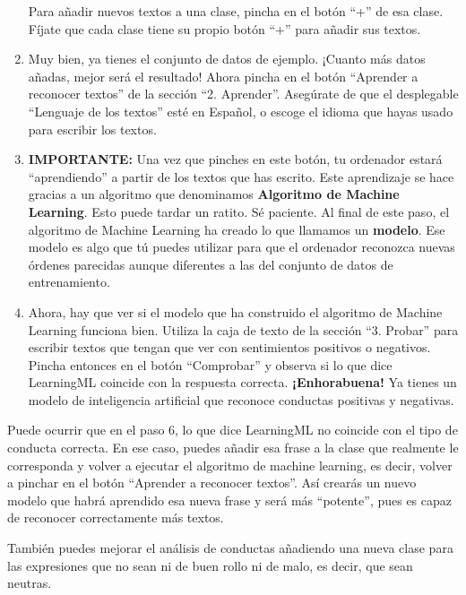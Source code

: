 \begin{enumerate}
    Para añadir nuevos textos a una clase, pincha en el botón ``+'' de esa clase. Fíjate que cada clase tiene su propio botón ``+'' para añadir sus textos.
    \item Muy bien, ya tienes el conjunto de datos de ejemplo. ¡Cuanto más datos añadas, mejor será el resultado! Ahora pincha en el botón ``Aprender a reconocer textos'' de la sección ``2. Aprender''. Asegúrate de que el desplegable ``Lenguaje de los textos'' esté en Español, o escoge el idioma que hayas usado para escribir los textos.
    \item \textbf{IMPORTANTE:} Una vez que pinches en este botón, tu ordenador estará ``aprendiendo'' a partir de los textos que has escrito. Este aprendizaje se hace gracias a un algoritmo que denominamos \textbf{Algoritmo de Machine Learning}. Esto puede tardar un ratito. Sé paciente. Al final de este paso, el algoritmo de Machine Learning ha creado lo que llamamos un \textbf{modelo}. Ese modelo es algo que tú puedes utilizar para que el ordenador reconozca nuevas órdenes parecidas aunque diferentes a las del conjunto de datos de entrenamiento.
    \item Ahora, hay que ver si el modelo que ha construido el algoritmo de Machine Learning funciona bien. Utiliza la caja de texto de la sección ``3. Probar'' para escribir textos que tengan que ver con sentimientos positivos o negativos. Pincha entonces en el botón ``Comprobar'' y observa si lo que dice LearningML coincide con la respuesta correcta.\newline
    \textbf{¡Enhorabuena!} Ya tienes un modelo de inteligencia artificial que reconoce conductas positivas y negativas.
\end{enumerate}

Puede ocurrir que en el paso 6, lo que dice LearningML no coincide con el tipo de conducta correcta. En ese caso, puedes añadir esa frase a la clase que realmente le corresponda y volver a ejecutar el algoritmo de machine learning, es decir, volver a pinchar en el botón ``Aprender a reconocer textos''. Así crearás un nuevo modelo que habrá aprendido esa nueva frase y será más ``potente'', pues es capaz de reconocer correctamente más textos.

También puedes mejorar el análisis de conductas añadiendo una nueva clase para las expresiones que no sean ni de buen rollo ni de malo, es decir, que sean neutras.

